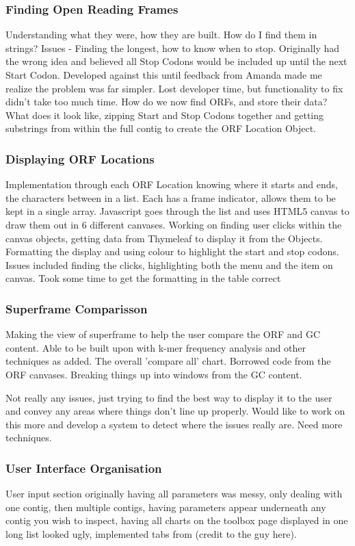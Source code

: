 \subsubsection{Finding Open Reading Frames}
Understanding what they were, how they are built. How do I find them in strings? Issues - Finding the longest, how to know when to stop. Originally had the wrong idea and believed all Stop Codons would be included up until the next Start Codon. Developed against this until feedback from Amanda made me realize the problem was far simpler. Lost developer time, but functionality to fix didn't take too much time. How do we now find ORFs, and store their data? What does it look like, zipping Start and Stop Codons together and getting substrings from within the full contig to create the ORF Location Object.

\subsubsection{Displaying ORF Locations}
Implementation through each ORF Location knowing where it starts and ends, the characters between in a list. Each has a frame indicator, allows them to be kept in a single array. Javascript goes through the list and uses HTML5 canvas to draw them out in 6 different canvases. Working on finding user clicks within the canvas objects, getting data from Thymeleaf to display it from the Objects. Formatting the display and using colour to highlight the start and stop codons.
Issues included finding the clicks, highlighting both the menu and the item on canvas. Took some time to get the formatting in the table correct

\subsubsection{Superframe Comparisson}
Making the view of superframe to help the user compare the ORF and GC content. Able to be built upon with k-mer frequency analysis and other techniques as added. The overall 'compare all' chart. Borrowed code from the ORF canvases. Breaking things up into windows from the GC content.

Not really any issues, just trying to find the best way to display it to the user and convey any areas where things don't line up properly. Would like to work on this more and develop a system to detect where the issues really are. Need more techniques.

\subsubsection{User Interface Organisation}
User input section originally having all parameters was messy, only dealing with one contig, then multiple contigs, having parameters appear underneath any contig you wish to inspect, having all charts on the toolbox page displayed in one long list looked ugly, implemented tabs from (credit to the guy here).

